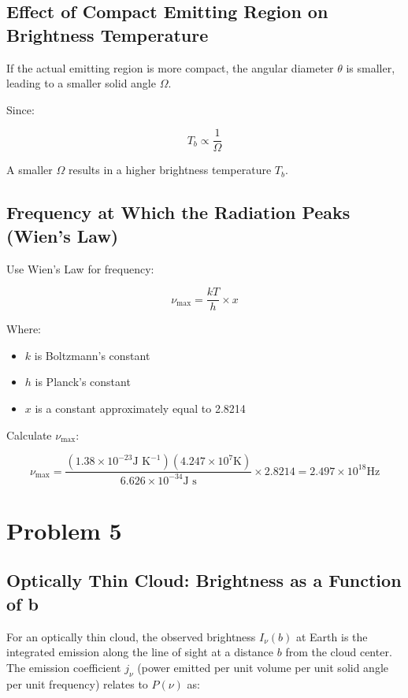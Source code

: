 \documentclass[12pt]{article}
\begin{document}
\subsection{Effect of Compact Emitting Region on Brightness Temperature}

If the actual emitting region is more compact, the angular diameter $\theta$ is smaller, leading to a smaller solid angle $\Omega$.

Since:

\[
    T_b \propto \dfrac{1}{\Omega}
\]

A smaller $\Omega$ results in a higher brightness temperature $T_b$.

\bigskip

\subsection{Frequency at Which the Radiation Peaks (Wien's Law)}

Use Wien's Law for frequency:

\[
    \nu_{\text{max}} = \dfrac{k T}{h} \times x
\]

Where:
\begin{itemize}
    \item $k$ is Boltzmann's constant
    \item $h$ is Planck's constant
    \item $x$ is a constant approximately equal to 2.8214
\end{itemize}

Calculate $\nu_{\text{max}}$:

\[
    \nu_{\text{max}} = \dfrac{(1.38 \times 10^{-23}\text{J K}^{-1})(4.247 \times 10^{7}\text{K})}{6.626 \times 10^{-34}\text{J s}} \times 2.8214 = 2.497 \times 10^{18}\text{Hz}
\]

\newpage

\section{Problem 5}


\subsection{Optically Thin Cloud: Brightness as a Function of b}

For an optically thin cloud, the observed brightness \( I_\nu(b) \) at Earth is the integrated emission along the line of sight at a distance \( b \) from the cloud center. The emission coefficient \( j_\nu \) (power emitted per unit volume per unit solid angle per unit frequency) relates to \( P(\nu) \) as:
\end{document}
